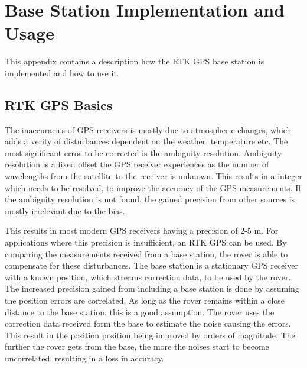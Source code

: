 \chapter{Base Station Implementation and Usage}\label{app:rtk_gps}
This appendix contains a description how the RTK GPS base station is implemented and how to use it.

\section*{RTK GPS Basics}
The inaccuracies of GPS receivers is mostly due to atmospheric changes, which adds a verity of disturbances dependent on the weather, temperature etc.
The most significant error to be corrected is the ambiguity resolution. 
Ambiguity resolution is a fixed offset the GPS receiver experiences as the number of wavelengths from the satellite to the receiver is unknown. 
This results in a integer which needs to be resolved, to improve the accuracy of the GPS measurements. 
If the ambiguity resolution is not found, the gained precision from other sources is mostly irrelevant due to the bias.\cite{novatel}\cite{RTK_GPS}\cite{ambg_res}

This results in most modern GPS receivers having a precision of 2-5 m. 
For applications where this precision is insufficient, an RTK GPS can be used. 
By comparing the measurements received from a base station, the rover is able to compensate for these disturbances.
The base station is a stationary GPS receiver with a known position, which streams correction data, to be used by the rover. 
The increased precision gained from including a base station is done by assuming the position errors are correlated.
As long as the rover remains within a close distance to the base station, this is a good assumption. 
The rover uses the correction data received form the base to estimate the noise causing the errors. 
This result in the position position being improved by orders of magnitude. 
The further the rover gets from the base, the more the noises start to become uncorrelated, resulting in a loss in accuracy.\cite{EmlidRTK}\cite{RTK_GPS}




